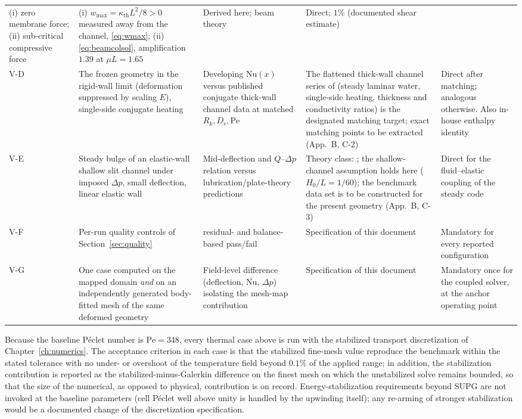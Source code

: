 \begin{longtable}{p{1.1cm}p{3.4cm}p{3.4cm}p{3.2cm}p{3.2cm}}
(i) zero membrane force; (ii) sub-critical compressive force &
(i) $w_{\max}=\kappa_{\mathrm{th}}L^2/8>0$ measured away from the channel, \eqref{eq:wmax}; (ii) \eqref{eq:beamcolsol}, amplification
$1.39$ at $\mu L=1.65$ &
Derived here; beam theory \cite{timoshenko1961stability} & Direct; $1\%$ (documented shear estimate) \\
V-D & The frozen geometry in the rigid-wall limit (deformation suppressed by scaling $E$), single-side conjugate heating &
Developing $\mathrm{Nu}(x)$ versus published conjugate thick-wall channel data at matched $R_k,D_r,\mathrm{Pe}$ &
The flattened thick-wall channel series of \cite{rahimi2024conjugate} (steady laminar water, single-side heating, thickness and conductivity ratios) is the designated matching target; exact matching points to be extracted (App.~B, C-2) & Direct after matching; analogous otherwise. Also in-house enthalpy identity \\
V-E & Steady bulge of an elastic-wall shallow slit channel under imposed $\Delta p$, small deflection, linear elastic wall &
Mid-deflection and $Q$--$\Delta p$ relation versus lubrication/plate-theory predictions &
Theory class: \cite{christov2018flow}; the shallow-channel assumption holds here ($H_0/L=1/60$); the benchmark data set is to be constructed for the present geometry (App.~B, C-3) &
Direct for the fluid--elastic coupling of the steady code \\
V-F & Per-run quality controls of Section~\ref{sec:quality} & residual- and balance-based pass/fail &
Specification of this document & Mandatory for every reported configuration \\
V-G & One case computed on the mapped domain \emph{and} on an independently generated body-fitted mesh of the same deformed geometry &
Field-level difference (deflection, $\overline{\mathrm{Nu}}$, $\Delta p$) isolating the mesh-map contribution &
Specification of this document & Mandatory once for the coupled solver, at the anchor operating point \\
\bottomrule
\end{longtable}

\medskip
Because the baseline P\'eclet number is $\mathrm{Pe}=348$, every thermal case above is run with the
stabilized transport discretization of Chapter~\ref{ch:numerics}. The acceptance criterion in each
case is that the stabilized fine-mesh value reproduce the benchmark within the stated tolerance
with no under- or overshoot of the temperature field beyond $0.1\%$ of the applied range; in
addition, the stabilization contribution is reported as the stabilized-minus-Galerkin difference
on the finest mesh on which the unstabilized solve remains bounded, so that the size of the
numerical, as opposed to physical, contribution is on record. Energy-stabilization requirements
beyond SUPG are not invoked at the baseline parameters (cell P\'eclet well above unity is handled
by the upwinding itself); any re-arming of stronger stabilization would be a documented change of
the discretization specification.

